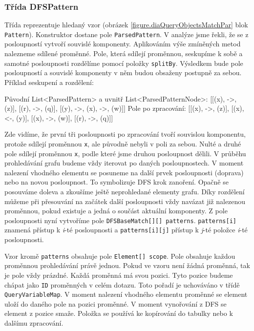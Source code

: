 \subsubsection{Třída DFSPattern}

Třída reprezentuje hledaný vzor (obrázek \ref{figure.diaQueryObjectsMatchPar} blok \texttt{Pattern}).
Konstruktor dostane pole \texttt{ParsedPattern}.
V analýze jsme řekli, že se z posloupností vytvoří souvislé komponenty.
Aplikováním výše zmíněných metod nalezneme sdílené proměnné.
Pole, která sdílejí proměnnou, seskupíme k sobě a samotné posloupnosti rozdělíme pomocí položky \texttt{splitBy}.
Výsledkem bude pole posloupností a souvislé komponenty v něm budou obsaženy postupně za sebou.
Příklad seskupení a rozdělení:
\begin{code}
Původní List<ParsedPattern> a uvnitř List<ParsedPatternNode>:
[[(x), ->, (z)], [(r), ->, (q)], [(y), ->, (x), ->, (w)]]
Pole po zpracování:
[[(x), ->, (z)], [(x), <-, (y)], [(x), ->, (w)], [(r), ->, (q)]]
\end{code}
Zde vidíme, že první tři posloupnosti po zpracování tvoří souvislou komponentu, protože sdílejí proměnnou \texttt{x}, ale původně nebyli v poli za sebou.
Nulté a druhé pole sdílejí proměnnou \texttt{x}, podle které jsme druhou posloupnost dělili.
V průběhu prohledávání grafu budeme vždy iterovat po daných posloupnostech.
V moment nalezení vhodného elementu se posuneme na další prvek posloupnosti (doprava) nebo na novou posloupnost.
To symbolizuje DFS krok zanoření.
Opačně se posouváme doleva a zkoušíme ještě neprohledané elementy grafu.
Díky rozdělení můžeme při přesouvání na začátek další posloupnosti vždy navázat již nalezenou proměnnou, pokud existuje a jedná o součást aktuální komponenty.
Z pole posloupnosti nyní vytvoříme pole \texttt{DFSBaseMatch[][] patterns}.
\texttt{patterns[i]} znamená přístup k \textit{i}-té posloupnosti a \texttt{patterns[i][j]} přístup k \textit{j}-té položce  \textit{i}-té posloupnosti. 

Vzor kromě \texttt{patterns} obsahuje pole \texttt{Element[] scope}.
Pole obsahuje každou proměnnou prohledávání právě jednou. 
Pokud ve vzoru není žádná proměnná, tak je pole vždy prázdné.
Každá proměnná má svou pozici.
Tyto pozice budeme chápat jako \texttt{ID} proměnných v celém dotazu.
Toto pořadí je uchováváno v třídě \texttt{QueryVariableMap}.
V moment nalezení vhodného elementu proměnné se element uloží do daného pole na pozici proměnné.
V moment vynořování z DFS se element z pozice smaže.
Položka se používá ke kopírování do tabulky nebo k dalšímu zpracování.

